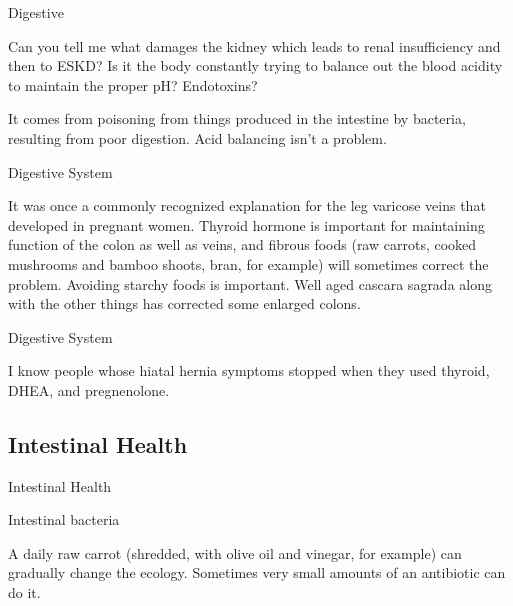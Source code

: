\documentclass[11pt,oneside,openany,extrafontsizes]{memoir}
\begin{document}
\begin{qaexchange}{Digestive}

    \begin{question}
        Can you tell me what damages the kidney which leads to renal insufficiency and then to ESKD? Is it the body constantly trying to balance out the blood acidity to maintain the proper pH? Endotoxins?
    \end{question}

    \begin{answer}
       It comes from poisoning from things produced in the intestine by bacteria, resulting from poor digestion. Acid balancing isn't a problem.
    \end{answer}
\end{qaexchange}

\begin{standalonequote}{Digestive System}

    \begin{answer}
       It was once a commonly recognized explanation for the leg varicose veins that developed in pregnant women. Thyroid hormone is important for maintaining function of the colon as well as veins, and fibrous foods (raw carrots, cooked mushrooms and bamboo shoots, bran, for example) will sometimes correct the problem. Avoiding starchy foods is important. Well aged cascara sagrada along with the other things has corrected some enlarged colons. 
    \end{answer}
\end{standalonequote}

\begin{standalonequote}{Digestive System}

    \begin{answer}
       I know people whose hiatal hernia symptoms stopped when they used thyroid, DHEA, and pregnenolone. 
    \end{answer}
\end{standalonequote}

\subsection{Intestinal Health}

\begin{standalonequote}{Intestinal Health}
    \begin{note}
        Intestinal bacteria
    \end{note}

    \begin{answer}
        A daily raw carrot (shredded, with olive oil and vinegar, for example) can gradually change the ecology. Sometimes very small amounts of an antibiotic can do it.
    \end{answer}
\end{standalonequote}
\end{document}
